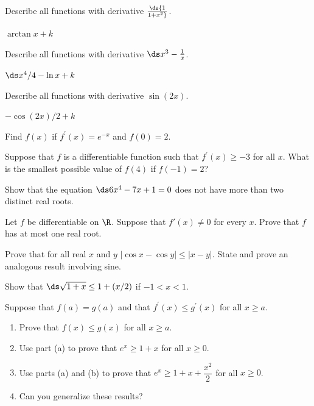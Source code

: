 \begin{enumialphparenastyle}
\begin{ex}
 Describe all functions with derivative $\ds {1\over 1+x^2}$.
\begin{sol}
 $\arctan x + k$
\end{sol}
\end{ex}

\begin{ex}
 Describe all functions with derivative $\ds x^3-{1\over x}$.
\begin{sol}
 $\ds x^4/4 -\ln x +k$
\end{sol}
\end{ex}

\begin{ex}
 Describe all functions with derivative $\sin(2x)$.
\begin{sol}
 $-\cos(2x)/2 +k$
\end{sol}
\end{ex}

\begin{ex}
Find $f\left( x\right) $ if $f^{\prime }\left( x\right) =e^{-x}$ and $%
f\left( 0\right) =2$.
\end{ex}

\begin{ex}
Suppose that $f$ is a differentiable function such that $f^{\prime }\left(
x\right) \geq -3$ for all $x.$ What is the smallest possible value of $%
f\left( 4\right) $ if $f\left( -1\right) =2$?
\end{ex}

\begin{ex}
 Show that the equation $\ds 6x^4 -7x+1 =0$ does not have more
than two distinct real roots.
\end{ex}

\begin{ex}
 Let $f$ be differentiable on $\R$. Suppose that $f'(x) \neq
0$ for every $x$. Prove that $f$ has at most one real root.
\end{ex}
 
\begin{ex}
 Prove that for all real $x$ and $y$
$|\cos x -\cos y | \leq |x-y|$.
State and prove an analogous result involving sine.
\end{ex}

\begin{ex}
Show that $\ds \sqrt{1+x} \le 1 +(x/2)$ if $-1<x<1$.
\end{ex}

\begin{ex}
Suppose that $f(a)=g(a)$
and that $f^{\prime}(x)\leq g^{\prime}(x)$ for
all $x\geq a$.
\begin{enumerate}
	\item	Prove that $f(x)\leq g(x)$ for all $x\geq a$.
	\item	Use part (a) to prove that $e^x\geq 1+x$ for all $x\geq	0$.
	\item	Use parts (a) and (b) to prove that $e^x\geq 1+x+\dfrac{x^2}{2}$ for all $x\geq 0$.
	\item	Can you generalize these results?
\end{enumerate}
\end{ex}

\end{enumialphparenastyle}

